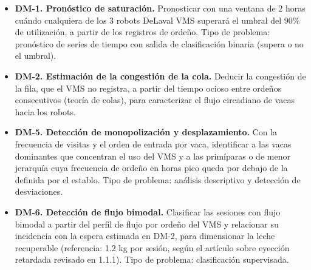 \begin{itemize}
  \item \textbf{DM-1. Pronóstico de saturación.} Pronosticar con una ventana de 2 horas cuándo cualquiera de los 3 robots DeLaval VMS superará el umbral del 90\% de utilización, a partir de los registros de ordeño. Tipo de problema: pronóstico de series de tiempo con salida de clasificación binaria (supera o no el umbral).
  \item \textbf{DM-2. Estimación de la congestión de la cola.} Deducir la congestión de la fila, que el VMS no registra, a partir del tiempo ocioso entre ordeños consecutivos (teoría de colas), para caracterizar el flujo circadiano de vacas hacia los robots.
  \item \textbf{DM-5. Detección de monopolización y desplazamiento.} Con la frecuencia de visitas y el orden de entrada por vaca, identificar a las vacas dominantes que concentran el uso del VMS y a las primíparas o de menor jerarquía cuya frecuencia de ordeño en horas pico queda por debajo de la definida por el establo. Tipo de problema: análisis descriptivo y detección de desviaciones.
  \item \textbf{DM-6. Detección de flujo bimodal.} Clasificar las sesiones con flujo bimodal a partir del perfil de flujo por ordeño del VMS y relacionar su incidencia con la espera estimada en DM-2, para dimensionar la leche recuperable (referencia: 1.2 kg por sesión, según el artículo sobre eyección retardada revisado en 1.1.1). Tipo de problema: clasificación supervisada.
\end{itemize}

